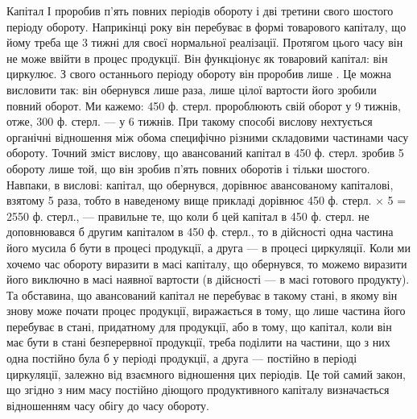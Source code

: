 Капітал І проробив п’ять повних періодів обороту і дві третини свого
шостого періоду обороту. Наприкінці року він перебуває в формі товарового
капіталу, що йому треба ще 3 тижні для своєї нормальної реалізації.
Протягом цього часу він не може ввійти в процес продукції.
Він функціонує як товаровий капітал: він циркулює. З свого останнього
періоду обороту він проробив лише . Це можна висловити так: він
обернувся лише  раза, лише  цілої вартости його зробили повний оборот.
Ми кажемо: 450 ф. стерл. пророблюють свій оборот у 9 тижнів, отже,
300 ф. стерл. — у 6 тижнів. При такому способі вислову нехтується органічні
відношення між обома специфічно різними складовими частинами часу обороту.
Точний зміст вислову, що авансований капітал в 450 ф. стерл. зробив
5 обороту лише той, що він зробив п’ять повних оборотів і тільки
 шостого. Навпаки, в вислові: капітал, що обернувся, дорівнює
авансованому капіталові, взятому 5 раза, тобто в наведеному вище прикладі
дорівнює 450 ф. стерл. × 5 = 2550 ф. стерл., — правильне те, що
коли б цей капітал в 450 ф. стерл. не доповнювався б другим капіталом
в 450 ф. стерл., то в дійсності одна частина його мусила б бути в процесі
продукції, а друга — в процесі циркуляції. Коли ми хочемо час обороту
виразити в масі капіталу, що обернувся, то можемо виразити його
виключно в масі наявної вартости (в дійсності — в масі готового продукту).
Та обставина, що авансований капітал не перебуває в такому
стані, в якому він знову може почати процес продукції, виражається в
тому, що лише частина його перебуває в стані, придатному для продукції,
або в тому, що капітал, коли він має бути в стані безперервної продукції,
треба поділити на частини, що з них одна постійно була б у періоді
продукції, а друга — постійно в періоді циркуляції, залежно від взаємного
відношення цих періодів. Це той самий закон, що згідно з ним
масу постійно діющого продуктивного капіталу визначається відношенням
часу обігу до часу обороту.

